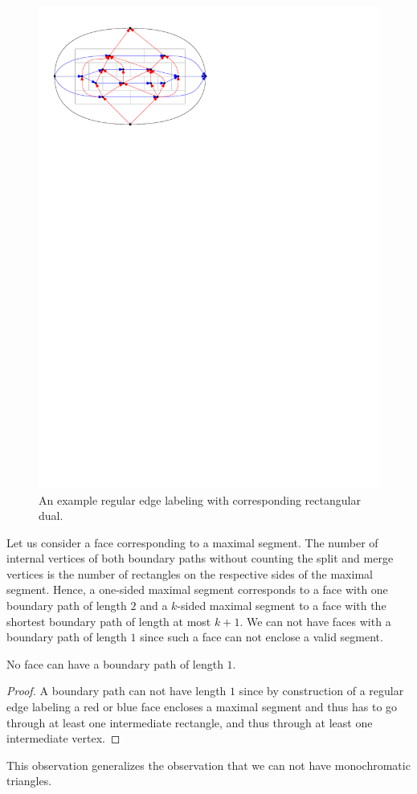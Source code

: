     \begin{figure}[t]
      \centering
      \includegraphics[scale=1]{rectangularDuals/img/relSegmentFaceRescale}
      \caption{An example regular edge labeling with corresponding rectangular dual.}
      \label{fig:rect:relSegmentFace}
    \end{figure}

    Let us consider a face corresponding to a maximal segment.
    The number of internal vertices of both boundary paths without counting the split and merge vertices is the number of rectangles on the respective sides of the maximal segment.
    Hence, a one-sided maximal segment corresponds to a face with one boundary path of length $2$  and a $k$-sided maximal segment to a face with the shortest boundary path of length at most $k+1$.
    We can not have faces with a boundary path of length $1$ since such a face can not enclose a valid segment.

    \begin{observation}
      \label{obs:rel:noBpOfLength1}
      No face can have a boundary path of length $1$.
    \end{observation}
    \begin{proof}
      A boundary path can not have length $1$ since by construction of a regular edge labeling a red or blue face encloses a maximal segment and thus has to go through at least one intermediate rectangle, and thus through at least one intermediate vertex.
    \end{proof}

    This observation generalizes the observation that we can not have monochromatic triangles.

